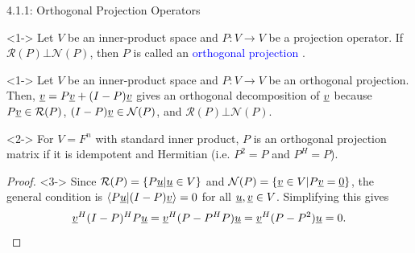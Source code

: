 \documentclass[10pt,letterpaper,english]{beamer}
\begin{document}
\begin{frame}{4.1.1: Orthogonal Projection Operators}

\begin{definition}<1->
Let $V$ be an inner-product space and $P \colon V \rightarrow V$ be a projection operator.
If $\mathcal{R}(P) \bot \mathcal{N}(P)$, then $P$ is called an \textcolor{blue}{orthogonal projection} .
\end{definition}

\begin{example}<1->
Let $V$ be an inner-product space and $P \colon V \rightarrow V$ be an orthogonal projection.
Then, $\underline{v} = P \underline{v} + (I-P) \underline{v}$ gives an orthogonal decomposition of $\underline{v}$ because $P \underline{v} \in \mathcal{R}(P)$, $(I-P) \underline{v} \in \mathcal{N}(P)$, and $\mathcal{R}(P) \bot \mathcal{N}(P)$.
\end{example}

\begin{theorem}<2->
For $V=F^n$ with standard inner product, $P$ is an orthogonal projection matrix if it is idempotent and Hermitian (i.e. $P^2=P$ and $P^H = P$).
\end{theorem}
\begin{proof}<3->
Since $\mathcal{R}(P) = \{ P\underline{u} | \underline{u}\in V \}$ and $\mathcal{N}(P) = \{ \underline{v}\in V | P\underline{v}=\underline{0} \}$, the general condition is $\langle P\underline{u} | (I-P)\underline{v} \rangle =0$ for all $\underline{u},\underline{v}\in V$.
Simplifying this gives \vspace{-2mm}
\[ \underline{v}^H (I-P)^H P \underline{u} = \underline{v}^H (P - P^H P) \underline{u} = \underline{v}^H (P - P^2) \underline{u} = 0.  \qedhere\]
\end{proof}

\end{frame}

\newcommand*{\vertbar}{\rule[-1ex]{0.5pt}{2.5ex}}
\end{document}
